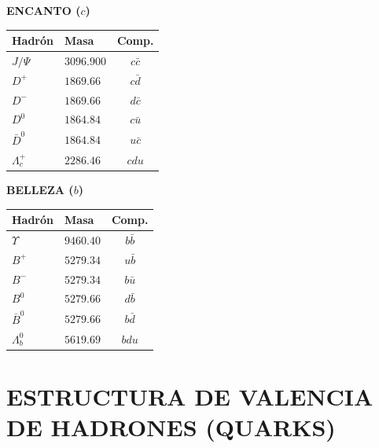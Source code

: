 \begin{minipage}{0.48\linewidth}
    \centering
    \textbf{ENCANTO ($c$)}
    \begin{tabular}{|l|l|c|}
        \hline
        \textbf{Hadrón} & \textbf{Masa} & \textbf{Comp.} \\ \hline
        $J/\Psi$ & $3096.900$ & $c\bar{c}$ \\ \hline
        $D^+$ & $1869.66$ & $c\bar{d}$ \\ \hline
        $D^-$ & $1869.66$ & $d\bar{c}$ \\ \hline
        $D^0$ & $1864.84$ & $c\bar{u}$ \\ \hline
        $\bar{D}^0$ & $1864.84$ & $u\bar{c}$ \\ \hline
        $\Lambda_c^+$ & $2286.46$ & $cdu$ \\ \hline
    \end{tabular}
\end{minipage}
\hfill
\begin{minipage}{0.48\linewidth}
    \centering
    \textbf{BELLEZA ($b$)}
    \begin{tabular}{|l|l|c|}
        \hline
        \textbf{Hadrón} & \textbf{Masa} & \textbf{Comp.} \\ \hline
        $\Upsilon$ & $9460.40$ & $b\bar{b}$ \\ \hline
        $B^+$ & $5279.34$ & $u\bar{b}$ \\ \hline
        $B^-$ & $5279.34$ & $b\bar{u}$ \\ \hline
        $B^0$ & $5279.66$ & $d\bar{b}$ \\ \hline
        $\bar{B}^0$ & $5279.66$ & $b\bar{d}$ \\ \hline
        $\Lambda_b^0$ & $5619.69$ & $bdu$ \\ \hline
    \end{tabular}
\end{minipage}

\vspace{0.2cm}






\section{ESTRUCTURA DE VALENCIA DE HADRONES (QUARKS)}

